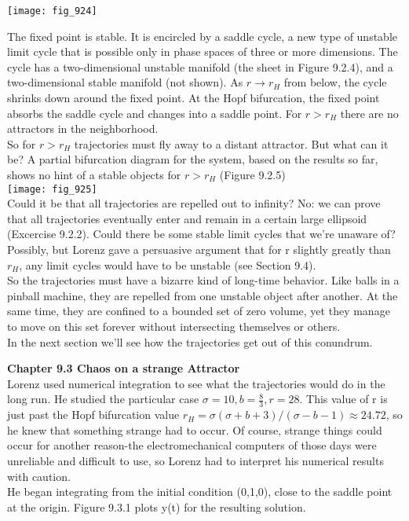 \documentclass{article}
\newcommand\tab[1][1cm]{\hspace*{#1}}
\begin{document}
\texttt{[image: fig\_924]}

The fixed point is stable. It is encircled by a saddle cycle, a new type of unstable limit cycle that is possible only in phase spaces of three or more dimensions. The cycle has a two-dimensional unstable manifold (the sheet in Figure 9.2.4), and a two-dimensional stable manifold (not shown). As $r \to r_{H}$ from below, the cycle shrinks down around the fixed point. At the Hopf bifurcation, the fixed point absorbs the saddle cycle and changes into a saddle point. For $r>r_{H}$ there are no attractors in the neighborhood. \\ \tab
So for $r>r_{H}$ trajectories must fly away to a distant attractor. But what can it be? A partial bifurcation diagram for the system, based on the results so far, shows no hint of a stable objects for $r>r_{H}$ (Figure 9.2.5) \\

\texttt{[image: fig\_925]} \\
Could it be that all trajectories are repelled out to infinity? No: we can prove that all trajectories eventually enter and remain in a certain large ellipsoid (Excercise 9.2.2). Could there be some stable limit cycles that we're unaware of? Possibly, but Lorenz gave a persuasive argument that for r slightly greatly than $r_{H}$, any limit cycles would have to be unstable (see Section 9.4). \\ \tab
So the trajectories must have a bizarre kind of long-time behavior. Like balls in a pinball machine, they are repelled from one unstable object after another. At the same time, they are confined to a bounded set of zero volume, yet they manage to move on this set forever without intersecting themselves or others. \\ \tab
In the next section we'll see how the trajectories get out of this conundrum. 

\textbf {Chapter 9.3 Chaos on a strange Attractor} \\
Lorenz used numerical integration to see what the trajectories would do in the long run. He studied the particular case $\sigma = 10, b = \frac{8}{3}, r=28$. This value of r is just past the Hopf bifurcation value $r_{H}=\sigma (\sigma + b + 3)/(\sigma - b - 1) \approx 24.72 $, so he knew that something strange had to occur. Of course, strange things could occur for another reason-the electromechanical computers of those days were unreliable and difficult to use, so Lorenz had to interpret his numerical results with caution. \\ \tab
He began integrating from the initial condition (0,1,0), close to the saddle point at the origin. Figure 9.3.1 plots y(t) for the resulting solution. \\
\end{document}
